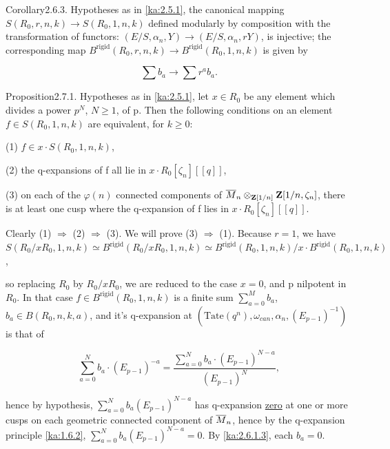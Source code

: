 \begin{kathm}{Corollary}{2.6.3.}
Hypotheses as in \eqref{ka:2.5.1}, the canonical mapping
$S(R_0,r,n,k)\longrightarrow S(R_0,1,n,k)$ defined modularly by composition with
the transformation of functors:
$(E/S,\alpha_n,Y)\longrightarrow(E/S,\alpha_n,rY)$, is injective; the
corresponding map
$B^{\mathrm{rigid}}(R_0,r,n,k)\longrightarrow B^{\mathrm{rigid}}(R_0,1,n,k)$ is
given by

\[
\sum b_a\longrightarrow\sum r^a b_a.
\]
\end{kathm}


\begin{kathm}{Proposition}{2.7.1.}
Hypotheses as in \eqref{ka:2.5.1}, let $x\in R_0$ be any element which divides a power
$p^N$, $N\geq 1$, of p. Then the following conditions on an element
$f\in S(R_0,1,n,k)$ are equivalent, for $k\geq 0$:

(1) $f\in x\cdot S(R_0,1,n,k)$,

(2) the q-expansions of f all lie in $x\cdot R_0[\zeta_n][[q]]$,

(3) on each of the $\varphi(n)$ connected components of
$\overline{M}_n\otimes_{\mathbf{Z}[1/n]}\mathbf{Z}[1/n,\zeta_n]$, there is at least one cusp where the
q-expansion of f lies in $x\cdot R_0[\zeta_n][[q]]$.
\end{kathm}

\begin{kaproof}
Clearly (1) $\Longrightarrow$ (2) $\Longrightarrow$ (3). We will prove
(3) $\Longrightarrow$ (1). Because $r=1$, we have
$S(R_0/xR_0,1,n,k)\simeq B^{\mathrm{rigid}}(R_0/xR_0,1,n,k)\simeq
B^{\mathrm{rigid}}(R_0,1,n,k)/x\cdot B^{\mathrm{rigid}}(R_0,1,n,k)$,

so replacing $R_0$ by $R_0/xR_0$, we are reduced to the case $x=0$, and p
nilpotent in $R_0$. In that case $f\in B^{\mathrm{rigid}}(R_0,1,n,k)$ is a
finite sum $\sum_{a=0}^{M} b_a$, $b_a\in B(R_0,n,k,a)$, and it's q-expansion at
$(\mathrm{Tate}(q^n),\omega_{can},\alpha_n,(E_{p-1})^{-1})$ is that of

\[
\sum_{a=0}^{N} b_a\cdot(E_{p-1})^{-a} =
\frac{\sum_{a=0}^{N} b_a\cdot(E_{p-1})^{N-a}}{(E_{p-1})^N},
\]

hence by hypothesis, $\sum_{a=0}^{N} b_a(E_{p-1})^{N-a}$ has q-expansion
\uline{zero} at one or more cusps on each geometric connected component of
$\overline{M}_n$, hence by the q-expansion principle \eqref{ka:1.6.2},
$\sum_{a=0}^{N} b_a(E_{p-1})^{N-a}=0$. By \eqref{ka:2.6.1.3}, each $b_a=0$.
\end{kaproof}

